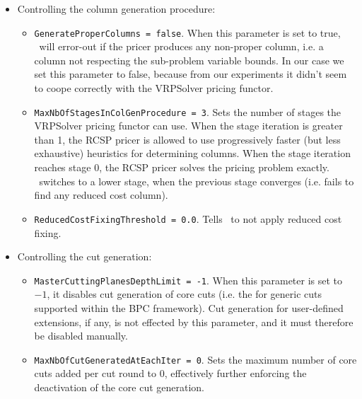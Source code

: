 \begin{itemize}
	\item Controlling the column generation procedure:
	      \begin{itemize}
		      \item \texttt{GenerateProperColumns = false}.
		            When this parameter is set to true, \bapcod\ will error-out if the pricer produces any non-proper column,
		            i.e. a column not respecting the sub-problem variable bounds.
		            In our case we set this parameter to false, because from our experiments it didn't seem to coope correctly with the VRPSolver pricing functor.
		      \item \texttt{MaxNbOfStagesInColGenProcedure = 3}.
		            Sets the number of stages the VRPSolver pricing functor can use.
		            When the stage iteration is greater than 1, the RCSP pricer is allowed to use
		            progressively faster (but less exhaustive) heuristics for determining columns.
		            When the stage iteration reaches stage 0, the RCSP pricer solves the pricing problem exactly.
		            \bapcod\ switches to a lower stage, when the previous stage converges (i.e. fails to find any reduced cost column).
		      \item \texttt{ReducedCostFixingThreshold = 0.0}.
		            Tells \bapcod\ to not apply reduced cost fixing.
	      \end{itemize}

	\item Controlling the cut generation:
	      \begin{itemize}
		      \item \texttt{MasterCuttingPlanesDepthLimit = -1}.
		            When this parameter is set to $-1$, it disables cut generation of core cuts
		            (i.e. the for generic cuts supported within the BPC framework).
		            Cut generation for user-defined extensions, if any, is not effected by this parameter,
		            and it must therefore be disabled manually.
		      \item \texttt{MaxNbOfCutGeneratedAtEachIter = 0}.
		            Sets the maximum number of core cuts added per cut round to $0$,
		            effectively further enforcing the deactivation of the core cut generation.
	      \end{itemize}


\end{itemize}
